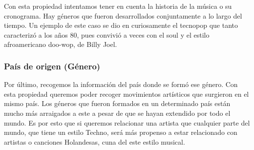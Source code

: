Con esta propiedad intentamos tener en cuenta la historia de la música o su cronograma. Hay géneros que fueron desarrollados conjuntamente a lo largo del tiempo. Un ejemplo de este caso se dio en curiosamente el tecnopop que tanto caracterizó a los años 80, pues convivió a veces con el soul y el estilo afroamericano doo-wop, de Billy Joel.

\subsubsection*{País de origen (Género)}

Por último, recogemos la información del país donde se formó ese género. Con esta propiedad queremos poder recoger movimientos artísticos que surgieron en el mismo país. Los géneros que fueron formados en un determinado país están mucho más arraigados a este a pesar de que se hayan extendido por todo el mundo. Es por esto que si queremos relacionar una artista que cualquier parte del mundo, que tiene un estilo Techno, será más propenso a estar relacionado con artistas o canciones Holandesas, cuna del este estilo musical.
